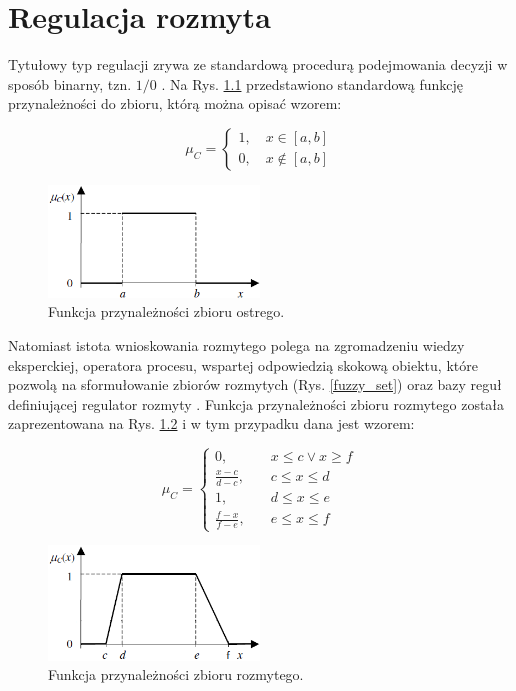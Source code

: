 \chapter{Regulacja rozmyta}
Tytułowy typ regulacji zrywa ze standardową procedurą podejmowania decyzji w sposób binarny, tzn. $1 / 0$ \cite{40}. Na Rys. \ref{crisp} przedstawiono standardową funkcję przynależności do zbioru, którą można opisać wzorem:

\begin{equation}
\mu_C = \begin{cases}
1, \quad x \in [a, b] \\
0, \quad x \notin [a, b]
\end{cases}
\end{equation}

\begin{figure}[h!]
\centering
\includegraphics[width=0.5\textwidth]{pictures/crisp}
\caption{Funkcja przynależności zbioru ostrego.}
\label{crisp}
\end{figure}

Natomiast istota wnioskowania rozmytego polega na zgromadzeniu wiedzy eksperckiej, operatora procesu, wspartej odpowiedzią skokową obiektu, które pozwolą na sformułowanie zbiorów rozmytych (Rys. \ref{fuzzy_set}) oraz bazy reguł definiującej regulator rozmyty \cite{160, 170}. Funkcja przynależności zbioru rozmytego została zaprezentowana na Rys. \ref{fuzzy} i w tym przypadku dana jest wzorem:

\begin{equation}
\mu_C = \begin{cases}
0,& \quad x \leq c \vee x \geq f \\
\frac{x-c}{d-c},& \quad c \leq x \leq d \\ 
1,& \quad d \leq x \leq e \\
\frac{f-x}{f-e},& \quad e \leq x \leq f
\end{cases}
\end{equation}

\begin{figure}[h!]
\centering
\includegraphics[width=0.5\textwidth]{pictures/fuzzy}
\caption{Funkcja przynależności zbioru rozmytego.}
\label{fuzzy}
\end{figure}

